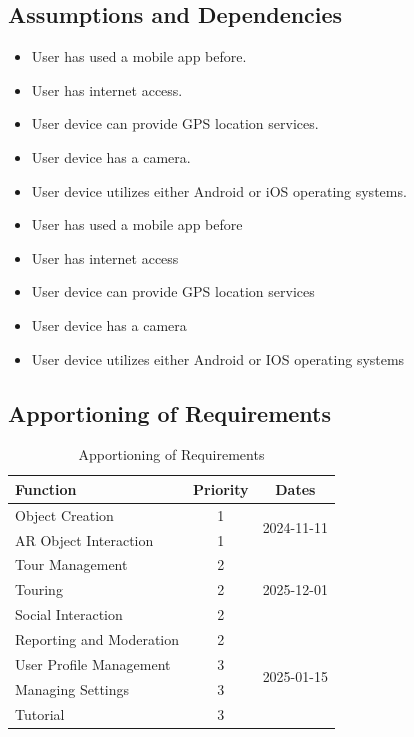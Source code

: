 \documentclass{article}
\begin{document}
\subsection{Assumptions and Dependencies}

\begin{itemize}
    \item User has used a mobile app before.
    \item User has internet access.
    \item User device can provide GPS location services.
    \item User device has a camera.
    \item User device utilizes either Android or iOS operating systems.
\end{itemize}

\begin{itemize}
    \item User has used a mobile app before
    \item User has internet access
    \item User device can provide GPS location services
    \item User device has a camera
    \item User device utilizes either Android or IOS operating systems
\end{itemize}

\subsection{Apportioning of Requirements}

\begin{table}[]
    \caption{Apportioning of Requirements}
    \label{tab:apportioning_table}
    \centering
    \begin{tabular}{lcc}
        \toprule
        \textbf{Function}        & \textbf{Priority} & \textbf{Dates}              \\
        \hline \hline
        Object Creation          & 1                 & \multirow{2}{*}{2024-11-11} \\
        AR Object Interaction    & 1                 &                             \\ \hline
        Tour Management          & 2                 & \multirow{3}{*}{2025-12-01} \\
        Touring                  & 2                 &                             \\
        Social Interaction       & 2                 &                             \\
        Reporting and Moderation & 2                 & \multirow{4}{*}{2025-01-15} \\ \hline
        User Profile Management  & 3                 &                             \\
        Managing Settings        & 3                 &                             \\
        Tutorial                 & 3                 &                             \\
        \hline
    \end{tabular}
\end{table}
\end{document}

